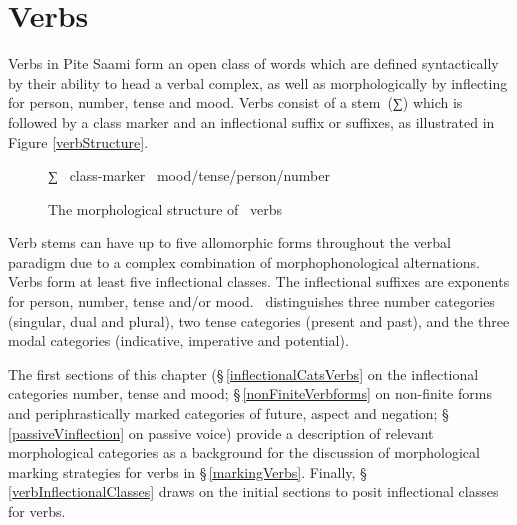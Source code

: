 

\chapter{Verbs}\label{verbs}
Verbs in Pite Saami form an open class of words which are defined syntactically by their ability to head a verbal complex, as well as morphologically by inflecting for person, number, tense and mood. 
Verbs consist of a \mbox{stem (∑)} which is followed by a class marker and an inflectional suffix or suffixes, %
as illustrated in Figure \vref{verbStructure}.

\begin{figure}\centering
∑ \PLUS\ class-marker \PLUS\ mood/tense/person/number%
\caption{The morphological structure of \PS\ verbs}\label{verbStructure}
\end{figure}

Verb stems can have up to five allomorphic forms throughout the verbal para\-digm due to a complex combination of morphophonological alternations. 
Verbs form at least five inflectional classes. 
The inflectional suffixes are exponents for person, number, tense and/or mood. 
\PS\ distinguishes three number categories (singular, dual and plural), two tense categories (present and past), and the three modal categories (indicative, imperative and potential). 


The first sections of this chapter (§\,\ref{inflectionalCatsVerbs} on the inflectional categories number, tense and mood; §\,\ref{nonFiniteVerbforms} on non-finite forms and periphrastically marked categories of future, aspect and negation; §\,\ref{passiveVinflection} on passive voice) provide a description of relevant morphological categories as a background for the discussion of morphological marking strategies for verbs in §\,\ref{markingVerbs}. Finally, §\,\ref{verbInflectionalClasses} draws on the initial sections to posit inflectional classes for verbs. 



